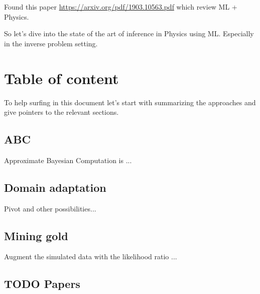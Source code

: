 Found this paper \url{https://arxiv.org/pdf/1903.10563.pdf} which review ML + Physics.

So let's dive into the state of the art of inference in Physics using ML.
Especially in the inverse problem setting.

\section{Table of content}

To help surfing in this document let's start with summarizing the approaches and give pointers to the relevant sections.


\subsection{ ABC }

Approximate Bayesian Computation is ...


\subsection{ Domain adaptation }

Pivot and other possibilities...


\subsection{ Mining gold }

Augment the simulated data with the likelihood ratio ...


\subsection{ TODO Papers }

